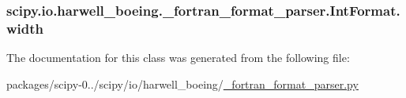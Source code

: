 \subsubsection[{width}]{\setlength{\rightskip}{0pt plus 5cm}scipy.\+io.\+harwell\+\_\+boeing.\+\_\+fortran\+\_\+format\+\_\+parser.\+Int\+Format.\+width}\label{classscipy_1_1io_1_1harwell__boeing_1_1__fortran__format__parser_1_1IntFormat_ae7e2b7f06713ddb4eeb47bbd7a7dc016}


The documentation for this class was generated from the following file\+:\begin{DoxyCompactItemize}
\item 
packages/scipy-\/0../scipy/io/harwell\+\_\+boeing/\hyperlink{__fortran__format__parser_8py}{\+\_\+fortran\+\_\+format\+\_\+parser.\+py}\end{DoxyCompactItemize}
